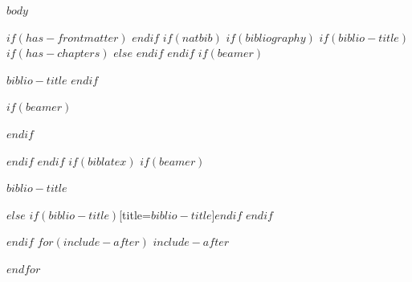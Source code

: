 \documentclass[
$if(fontsize)$
  $fontsize$,
$endif$
$if(papersize)$
  $papersize$paper,
$endif$
$if(beamer)$
  ignorenonframetext,
$if(handout)$
  handout,
$endif$
$if(aspectratio)$
  aspectratio=$aspectratio$,
$endif$
$endif$
$for(classoption)$
  $classoption$$sep$,
$endfor$
]{$documentclass$}
\newif\ifbibliography
\begin{document}
\pagebreak
{}




$body$

$if(has-frontmatter)$
\backmatter
$endif$
$if(natbib)$
$if(bibliography)$
$if(biblio-title)$
$if(has-chapters)$
\renewcommand\bibname{$biblio-title$}
$else$
\renewcommand\refname{$biblio-title$}
$endif$
$endif$
$if(beamer)$
\begin{frame}[allowframebreaks]{$biblio-title$}
  \bibliographytrue
$endif$
  
$if(beamer)$
\end{frame}
$endif$

$endif$
$endif$
$if(biblatex)$
$if(beamer)$
\begin{frame}[allowframebreaks]{$biblio-title$}
  \bibliographytrue
  \printbibliography[heading=none]
\end{frame}
$else$
\printbibliography$if(biblio-title)$[title=$biblio-title$]$endif$
$endif$

$endif$
$for(include-after)$
$include-after$

$endfor$
\end{document}
